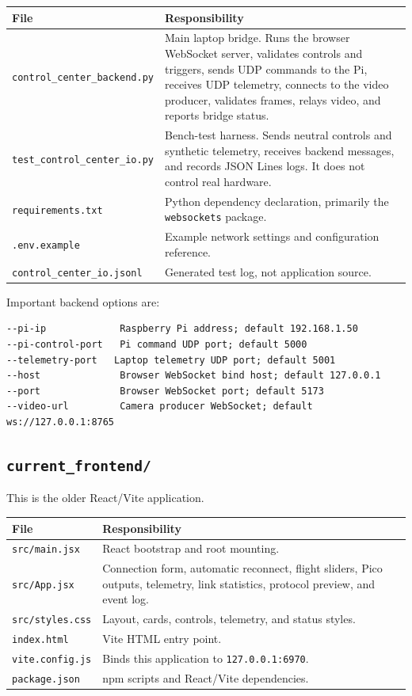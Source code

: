 \documentclass[11pt]{article}
\begin{document}
\begin{longtable}{p{}p{}}
\toprule
\textbf{File} & \textbf{Responsibility}\\
\midrule
\texttt{control\_center\_backend.py} &
Main laptop bridge. Runs the browser WebSocket server, validates controls and
triggers, sends UDP commands to the Pi, receives UDP telemetry, connects to
the video producer, validates frames, relays video, and reports bridge status.\\
\texttt{test\_control\_center\_io.py} &
Bench-test harness. Sends neutral controls and synthetic telemetry, receives
backend messages, and records JSON Lines logs. It does not control real
hardware.\\
\texttt{requirements.txt} &
Python dependency declaration, primarily the \texttt{websockets} package.\\
\texttt{.env.example} &
Example network settings and configuration reference.\\
\texttt{control\_center\_io.jsonl} &
Generated test log, not application source.\\
\bottomrule
\end{longtable}

Important backend options are:

\begin{lstlisting}
--pi-ip             Raspberry Pi address; default 192.168.1.50
--pi-control-port   Pi command UDP port; default 5000
--telemetry-port   Laptop telemetry UDP port; default 5001
--host              Browser WebSocket bind host; default 127.0.0.1
--port              Browser WebSocket port; default 5173
--video-url         Camera producer WebSocket; default ws://127.0.0.1:8765
\end{lstlisting}

\subsection{\texttt{current\_frontend/}}

This is the older React/Vite application.

\begin{longtable}{p{}p{}}
\toprule
\textbf{File} & \textbf{Responsibility}\\
\midrule
\texttt{src/main.jsx} & React bootstrap and root mounting.\\
\texttt{src/App.jsx} &
Connection form, automatic reconnect, flight sliders, Pico outputs,
telemetry, link statistics, protocol preview, and event log.\\
\texttt{src/styles.css} & Layout, cards, controls, telemetry, and status styles.\\
\texttt{index.html} & Vite HTML entry point.\\
\texttt{vite.config.js} & Binds this application to \texttt{127.0.0.1:6970}.\\
\texttt{package.json} & npm scripts and React/Vite dependencies.\\
\bottomrule
\end{longtable}
\end{document}
